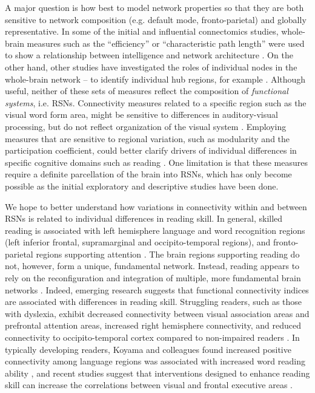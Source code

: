 A major question is how best to model network properties so that they are both sensitive to network composition (e.g. default mode, fronto-parietal) and globally representative. In some of the initial and influential connectomics studies, whole-brain measures such as the ``efficiency'' or ``characteristic path length'' were used to show a relationship between intelligence and network architecture \citep{Stam2014}. On the other hand, other studies have investigated the roles of individual nodes in the whole-brain network -- to identify individual hub regions, for example \citep{Betzel2013}. Although useful, neither of these sets of measures reflect the composition of \textit{functional systems}, i.e. RSNs. Connectivity measures related to a specific region such as the visual word form area, might be sensitive to differences in auditory-visual processing, but do not reflect organization of the visual system \citep{Rubinov2010}. Employing measures that are sensitive to regional variation, such as modularity and the participation coefficient, could better clarify drivers of individual differences in specific cognitive domains such as reading \citep{Cao2016}. One limitation is that these measures require a definite parcellation of the brain into RSNs, which has only become possible as the initial exploratory and descriptive studies have been done.

We hope to better understand how variations in connectivity within and between RSNs is related to individual differences in reading skill. In general, skilled reading is associated with left hemisphere language and word recognition regions (left inferior frontal, supramarginal and occipito-temporal regions), and fronto-parietal regions supporting attention \citep{Paulesu2014}. The brain regions supporting reading do not, however, form a unique, fundamental network. Instead, reading appears to rely on the reconfiguration and integration of multiple, more fundamental brain networks \citep{Koyama2010, Vogel2013}. Indeed, emerging research suggests that functional connectivity indices are associated with differences in reading skill. Struggling readers, such as those with dyslexia, exhibit decreased connectivity between visual association areas and prefrontal attention areas, increased right hemisphere connectivity, and reduced connectivity to occipito-temporal cortex compared to non-impaired readers \citep{Finn2014}. In typically developing readers, Koyama and colleagues found increased positive connectivity among language regions was associated with increased word reading ability \citep{Koyama2011}, and recent studies suggest that interventions designed to enhance reading skill can increase the correlations between visual and frontal executive areas \citep{Horowitz-Kraus2015}. 

